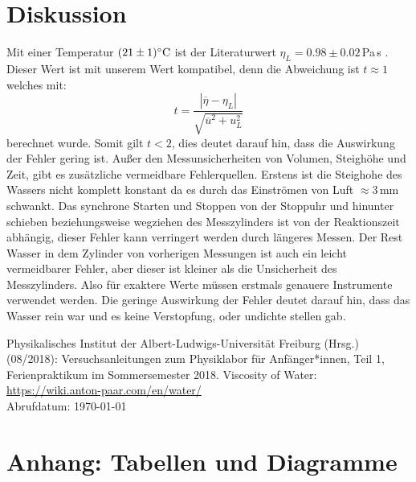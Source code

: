 \documentclass[11pt,a4paper]{article}
\begin{document}
\section{Diskussion}

Mit einer Temperatur $(21\pm 1)\celsius$ ist der Literaturwert $\eta_L = 0.98\pm 0.02$\,Pa\,s \cite{Litval}. Dieser Wert ist mit unserem Wert kompatibel, denn die Abweichung ist $t \approx 1$ welches mit:
$$t = \frac{|\overline{\eta}-\eta_L|}{\sqrt{\overline{u}^2 + u_L^2}}$$
berechnet wurde. Somit gilt $t<2$, dies deutet darauf hin, dass die Auswirkung der Fehler gering ist. Außer den Messunsicherheiten von Volumen, Steighöhe und Zeit, gibt es zusätzliche vermeidbare Fehlerquellen. Erstens ist die Steighohe des Wassers nicht komplett konstant da es durch das Einströmen von Luft $\approx 3$\,mm schwankt. Das synchrone Starten und Stoppen von der Stoppuhr und hinunter schieben beziehungsweise wegziehen des Messzylinders ist von der Reaktionszeit abhängig, dieser Fehler kann verringert werden durch längeres Messen. Der Rest Wasser in dem Zylinder von vorherigen Messungen ist auch ein leicht vermeidbarer Fehler, aber dieser ist kleiner als die Unsicherheit des Messzylinders. Also für exaktere Werte müssen erstmals genauere Instrumente verwendet werden. Die geringe Auswirkung der Fehler deutet darauf hin, dass das Wasser rein war und es keine Verstopfung, oder undichte stellen gab. 

\begin{thebibliography}{9}
 Physikalisches Institut der Albert-Ludwigs-Universität Freiburg (Hrsg.) (08/2018): Versuchsanleitungen zum Physiklabor für Anfänger*innen, Teil 1, Ferienpraktikum im Sommersemester 2018.
 Viscosity of Water:  \url{https://wiki.anton-paar.com/en/water/}\\ Abrufdatum: \today
\end{thebibliography}

\pagebreak

\section{Anhang: Tabellen und Diagramme}
\end{document}
